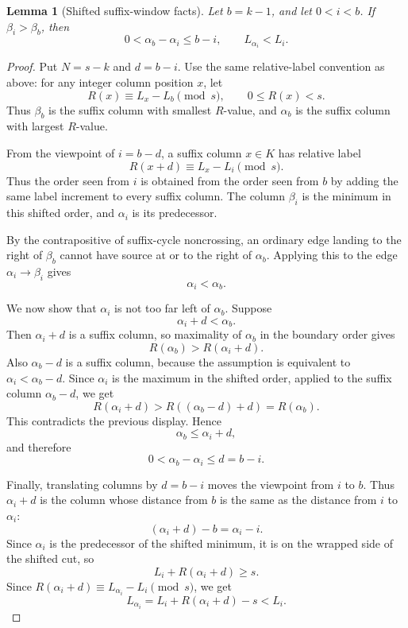 \documentclass[10pt]{article}
\newtheorem{lemma}{Lemma}
\begin{document}
\begin{lemma}[Shifted suffix-window facts]
Let \(b=k-1\), and let \(0<i<b\).  If \(\beta_i>\beta_b\), then
\[
  0<\alpha_b-\alpha_i\le b-i,\qquad
  L_{\alpha_i}<L_i.
\]
\end{lemma}

\begin{proof}
Put \(N=s-k\) and \(d=b-i\).  Use the same relative-label convention as above:
for any integer column position \(x\), let
\[
  R(x)\equiv L_x-L_b\pmod s,\qquad 0\le R(x)<s.
\]
Thus \(\beta_b\) is the suffix column with smallest \(R\)-value, and
\(\alpha_b\) is the suffix column with largest \(R\)-value.

From the viewpoint of \(i=b-d\), a suffix column \(x\in K\) has relative label
\[
  R(x+d)\equiv L_x-L_i\pmod s.
\]
Thus the order seen from \(i\) is obtained from the order seen from \(b\) by
adding the same label increment to every suffix column.  The column \(\beta_i\)
is the minimum in this shifted order, and \(\alpha_i\) is its predecessor.

By the contrapositive of suffix-cycle noncrossing, an ordinary edge landing to
the right of \(\beta_b\) cannot have source at or to the right of
\(\alpha_b\).  Applying this to the edge \(\alpha_i\to\beta_i\) gives
\[
  \alpha_i<\alpha_b.
\]

We now show that \(\alpha_i\) is not too far left of \(\alpha_b\).  Suppose
\[
  \alpha_i+d<\alpha_b.
\]
Then \(\alpha_i+d\) is a suffix column, so maximality of \(\alpha_b\) in the
boundary order gives
\[
  R(\alpha_b)>R(\alpha_i+d).
\]
Also \(\alpha_b-d\) is a suffix column, because the assumption is equivalent to
\(\alpha_i<\alpha_b-d\).  Since \(\alpha_i\) is the maximum in the shifted
order, applied to the suffix column \(\alpha_b-d\), we get
\[
  R(\alpha_i+d)>R((\alpha_b-d)+d)=R(\alpha_b).
\]
This contradicts the previous display.  Hence
\[
  \alpha_b\le\alpha_i+d,
\]
and therefore
\[
  0<\alpha_b-\alpha_i\le d=b-i.
\]

  Finally, translating columns by \(d=b-i\) moves the viewpoint from \(i\) to
\(b\).  Thus \(\alpha_i+d\) is the column whose distance from \(b\) is the
same as the distance from \(i\) to \(\alpha_i\):
\[
  (\alpha_i+d)-b=\alpha_i-i.
\]
Since \(\alpha_i\) is the predecessor of the shifted minimum,
it is on the wrapped side of the shifted cut, so
\[
  L_i+R(\alpha_i+d)\ge s.
\]
Since \(R(\alpha_i+d)\equiv L_{\alpha_i}-L_i\pmod s\), we get
\[
  L_{\alpha_i}=L_i+R(\alpha_i+d)-s<L_i.
\]
\end{proof}
\end{document}
